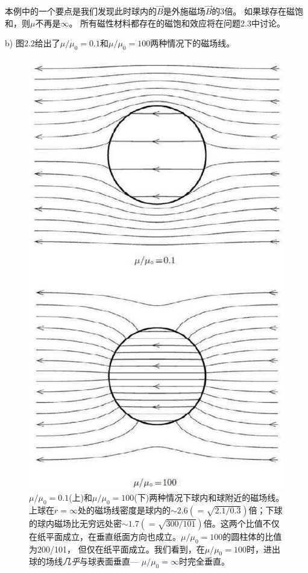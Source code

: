 本例中的一个要点是我们发现此时球内的$\vec{B}$是外施磁场$\vec{B}$的3倍。
如果球存在磁饱和，则$\mu$不再是$\infty$。
所有磁性材料都存在的磁饱和效应将在问题2.3中讨论。

b) 图2.2给出了$\mu/\mu_0=0.1$和$\mu/\mu_0=100$两种情况下的磁场线。

\begin{figure}[htbp]
  \centering
 \includegraphics[scale=0.5]{chpt2/figs/fig2.2.eps}
  \caption{$\mu/\mu_0=0.1$(上)和$\mu/\mu_0=100$(下)两种情况下球内和球附近的磁场线。上球在$r=\infty$处的磁场线密度是球内的$\sim 2.6(=\sqrt{2.1/0.3})$倍；下球的球内磁场比无穷远处密$\sim 1.7(=\sqrt{300/101})$倍。这两个比值不仅在纸平面成立，在垂直纸面方向也成立。$\mu/\mu_0=100$的圆柱体的比值为200/101，
  但仅在纸平面成立。我们看到，在$\mu/\mu_0=100$时，进出球的场线\textit{几乎}与球表面垂直---
  $\mu/\mu_0=\infty$时完全垂直。}
\end{figure}

